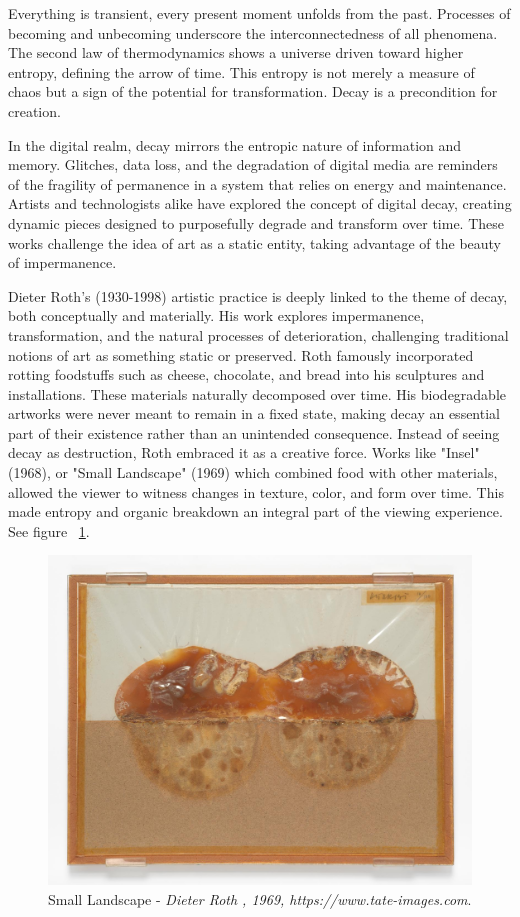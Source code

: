 Everything is transient, every present moment unfolds from the past. Processes of becoming and unbecoming underscore the interconnectedness of all phenomena. The second law of thermodynamics shows a universe driven toward higher entropy, defining the arrow of time. This entropy is not merely a measure of chaos but a sign of the potential for transformation. Decay is a precondition for creation.

In the digital realm, decay mirrors the entropic nature of information and memory. Glitches, data loss, and the degradation of digital media are reminders of the fragility of permanence in a system that relies on energy and maintenance. Artists and technologists alike have explored the concept of digital decay, creating dynamic pieces designed to purposefully degrade and transform over time. These works challenge the idea of art as a static entity, taking advantage of the beauty of impermanence.


Dieter Roth’s  (1930-1998) artistic practice is deeply linked to the theme of decay, both conceptually and materially. His work explores impermanence, transformation, and the natural processes of deterioration, challenging traditional notions of art as something static or preserved. Roth famously incorporated rotting foodstuffs such as cheese, chocolate, and bread into his sculptures and installations. These materials naturally decomposed over time. His biodegradable artworks were never meant to remain in a fixed state, making decay an essential part of their existence rather than an unintended consequence. Instead of seeing decay as destruction, Roth embraced it as a creative force. Works like "Insel" (1968), or "Small Landscape" (1969) which combined food with other materials, allowed the viewer to witness changes in texture, color, and form over time. This made entropy and organic breakdown an integral part of the viewing experience. See figure ~\ref{fig:roth}.


\begin{figure}
    \centering
    \includegraphics[width=0.8\linewidth]{assets/roth.jpg} 
    \caption{\small Small Landscape - \textit{Dieter Roth , 1969, https://www.tate-images.com}.}
    \label{fig:roth}
\end{figure}


